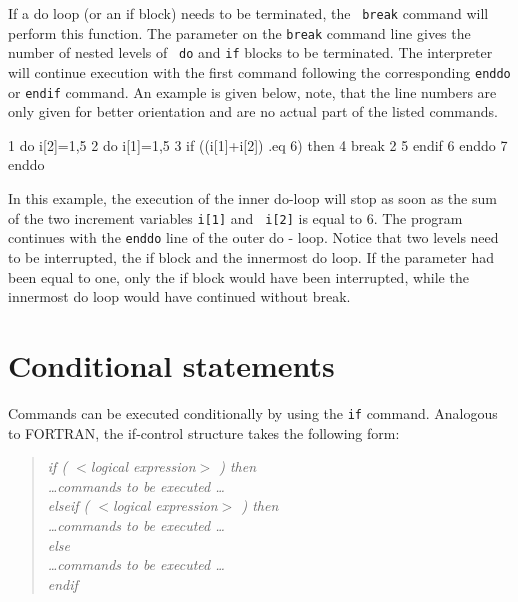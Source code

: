 If a do loop (or an if block) needs to be terminated, the {\tt
break} command will perform this function.  The parameter on the
{\tt break} command line gives the number of nested levels of {\tt
do} and {\tt if} blocks to be terminated. The interpreter will
continue execution with the first command following the
corresponding {\tt enddo} or {\tt endif} command.  An example is
given below, note, that the line numbers are only given for better
orientation and are no actual part of the listed commands. \par

\begin{MacVerbatim}
     1  do i[2]=1,5
     2    do i[1]=1,5
     3      if ((i[1]+i[2]) .eq 6) then
     4        break 2
     5      endif
     6    enddo
     7  enddo
\end{MacVerbatim}

In this example, the execution of the inner do-loop will stop as
soon as the sum of the two increment variables {\tt i[1]} and {\tt
i[2]} is equal to 6.  The program continues with the {\tt enddo}
line of the outer do - loop.  Notice that two levels need to be
interrupted, the if block and the innermost do loop.  If the
parameter had been equal to one, only the if block would have been
interrupted, while the innermost do loop would have continued
without break. \par


\section{Conditional statements \label{if}}

Commands can be executed conditionally by using the {\tt if}
command. Analogous to FORTRAN, the if-control structure takes the
following form:

\begin{quote}
{\it if ( $<$logical expression$>$ ) then \\
     \ldots commands to be executed \ldots \\
     elseif ( $<$logical expression$>$ ) then \\
     \ldots commands to be executed \ldots \\
     else \\
     \ldots commands to be executed \ldots \\
     endif }
\end{quote}

